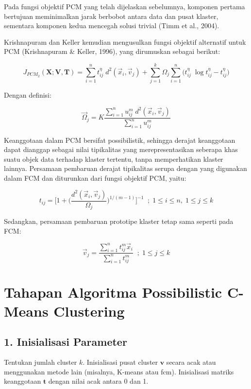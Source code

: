 \documentclass[
  oneside]{book}
\begin{document}
Pada fungsi objektif PCM yang telah dijelaskan sebelumnya, komponen pertama bertujuan meminimalkan jarak berbobot antara data dan pusat klaster, sementara komponen kedua mencegah solusi trivial (Timm et al., 2004).

Krishnapuram dan Keller kemudian mengusulkan fungsi objektif alternatif untuk PCM (Krishnapuram \& Keller, 1996), yang dirumuskan sebagai berikut:

\[
J_{PCM_2}(\mathbf{X}; \mathbf{V}, \mathbf{T}) = \sum\limits_{i=1}^n t_{ij}^\eta \; d^2(\vec{x}_i, \vec{v}_j) + \sum\limits_{j=1}^k \Omega_j \sum\limits_{i=1}^n \big(t_{ij}^\eta \; \log{t_{ij}^\eta} - t_{ij}^\eta \big)
\]

Dengan definisi:

\[
\vec{\Omega}_j = K \frac{\sum\limits_{i=1}^n u_{ij}^m \; d^2(\vec{x}_i, \vec{v}_j)}{\sum\limits_{i=1}^n u_{ij}^m}
\]

Keanggotaan dalam PCM bersifat possibilistik, sehingga derajat keanggotaan dapat dianggap sebagai nilai tipikalitas yang merepresentasikan seberapa khas suatu objek data terhadap klaster tertentu, tanpa memperhatikan klaster lainnya. Persamaan pembaruan derajat tipikalitas serupa dengan yang digunakan dalam FCM dan diturunkan dari fungsi objektif PCM, yaitu:

\[
t_{ij} = \Bigg[ 1 + \Big(\frac{d^2(\vec{x}_i, \vec{v}_j)}{\Omega_j}\Big)^{1/(m-1)} \Bigg]^{-1} \;\;; \; 1 \leq i \leq n,\; 1 \leq j \leq k
\]

Sedangkan, persamaan pembaruan prototipe klaster tetap sama seperti pada FCM:

\[
\vec{v}_j = \frac{\sum\limits_{i=1}^n t_{ij}^m \vec{x}_i}{\sum\limits_{i=1}^n t_{ij}^m} \;\;; \; 1 \leq j \leq k
\]

\section{Tahapan Algoritma Possibilistic C-Means Clustering}\label{tahapan-algoritma-possibilistic-c-means-clustering}

\subsection*{1. Inisialisasi Parameter}\label{inisialisasi-parameter-1}

Tentukan jumlah cluster \(k\). Inisialisasi pusat cluster \(\mathbf{v}\) secara acak atau menggunakan metode lain (misalnya, K-means atau fcm). Inisialisasi matriks keanggotaan \(\mathbf{t}\) dengan nilai acak antara 0 dan 1.
\end{document}
